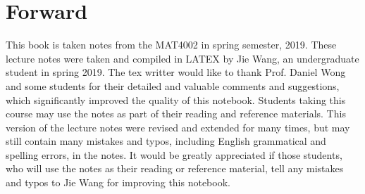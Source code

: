 \chapter*{Forward}

This book is taken notes from the MAT4002 in spring semester, 2019. These lecture notes were taken and compiled in LATEX by Jie Wang, an undergraduate student in spring 2019. The tex writter would like to thank Prof. Daniel Wong and some students for their detailed and valuable comments and suggestions, which significantly improved the quality of this notebook. Students taking this course may use the notes as part of their reading and reference materials. This version of the lecture notes were revised and extended for many times, but may still contain many mistakes and typos, including English grammatical and spelling errors, in the notes. It would be greatly appreciated if those students, who will use the notes as their reading or reference material, tell any mistakes and typos to Jie Wang for improving this notebook.